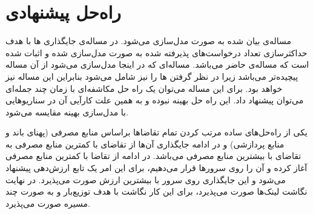 \chapter{راه‌حل پیشنهادی}

مساله‌ی بیان شده به صورت 
مدل‌سازی می‌شود.
در \cite{Eramo2016}
مساله‌ی جایگذاری ها با هدف حداکثرسازی تعداد درخواست‌های پذیرفته شده
به صورت  مدل‌سازی شده و اثبات شده است که مساله‌ی حاضر  می‌باشد.
مساله‌ای که در اینجا مدل‌سازی می‌شود از آن مساله پیچیده‌تر می‌باشد زیرا در نظر گرفتن ها را نیز شامل می‌شود
بنابراین این مساله نیز  خواهد بود.
برای این مساله می‌توان
یک راه حل مکاشفه‌ای با زمان چند جمله‌ای
می‌توان پیشنهاد داد. این راه حل بهینه نبوده و به همین علت کارآیی آن
در سناریوهایی با مدل‌سازی بهینه مقایسه می‌شود.

یکی از راه‌حل‌های ساده مرتب کردن تمام تقاضاها براساس منابع مصرفی (پهنای باند و منابع پردازشی)
و در ادامه جایگذاری آن‌ها از تقاضای با کمترین منابع مصرفی به تقاضای با بیشترین منابع مصرفی می‌باشد.
در ادامه از تقاضا با کمترین منابع مصرفی آغاز کرده و آن را روی سرورها قرار می‌دهیم، برای این امر یک تابع ارزش‌دهی پیشنهاد می‌شود
و این جایگذاری روی سرور با بیشترین ارزش صورت می‌پذیرد.
در نهایت نگاشت لینک‌ها صورت می‌پذیرد، برای این کار نگاشت با هدف توزیع‌بار و به صورت چند مسیره صورت می‌پذیرد.